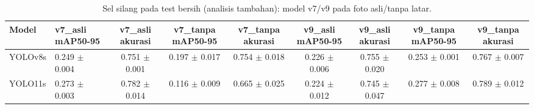 \begin{table}[!t]
\centering
\caption{Sel silang pada test bersih (analisis tambahan): model v7/v9 pada foto asli/tanpa latar.}
\label{tab:v9_silang}
\footnotesize
\setlength{\tabcolsep}{3pt}
\begin{tabular}{llccccccc}
\hline
\textbf{Model} & \textbf{v7\_asli mAP50-95} & \textbf{v7\_asli akurasi} & \textbf{v7\_tanpa mAP50-95} & \textbf{v7\_tanpa akurasi} & \textbf{v9\_asli mAP50-95} & \textbf{v9\_asli akurasi} & \textbf{v9\_tanpa mAP50-95} & \textbf{v9\_tanpa akurasi} \\
\hline
YOLOv8s & 0.249 $\pm$ 0.004 & 0.751 $\pm$ 0.001 & 0.197 $\pm$ 0.017 & 0.754 $\pm$ 0.018 & 0.226 $\pm$ 0.006 & 0.755 $\pm$ 0.020 & 0.253 $\pm$ 0.001 & 0.767 $\pm$ 0.007 \\
YOLO11s & 0.273 $\pm$ 0.003 & 0.782 $\pm$ 0.014 & 0.116 $\pm$ 0.009 & 0.665 $\pm$ 0.025 & 0.224 $\pm$ 0.012 & 0.745 $\pm$ 0.047 & 0.277 $\pm$ 0.008 & 0.789 $\pm$ 0.012 \\
\hline
\end{tabular}
\end{table}
